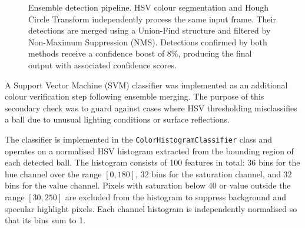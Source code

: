 \begin{figure}[h]
\centering
{}
\caption[Ensemble detection pipeline: HSV and Hough merged via Union-Find and NMS.]{Ensemble detection pipeline. HSV colour segmentation and Hough Circle
Transform independently process the same input frame. Their detections are merged
using a Union-Find structure and filtered by Non-Maximum Suppression (NMS).
Detections confirmed by both methods receive a confidence boost of 8\%, producing
the final output with associated confidence scores.}
\label{fig:ensemble}
\end{figure}


A Support Vector Machine (SVM) classifier was implemented as an additional colour
verification step following ensemble merging. The purpose of this secondary check
was to guard against cases where HSV thresholding misclassifies a ball due to
unusual lighting conditions or surface reflections.

The classifier is implemented in the \texttt{ColorHistogramClassifier} class and
operates on a normalised HSV histogram extracted from the bounding region of each
detected ball. The histogram consists of 100 features in total: 36 bins for the
hue channel over the range $[0, 180]$, 32 bins for the saturation channel, and
32 bins for the value channel. Pixels with saturation below 40 or value outside
the range $[30, 250]$ are excluded from the histogram to suppress background and
specular highlight pixels. Each channel histogram is independently normalised so
that its bins sum to 1.

